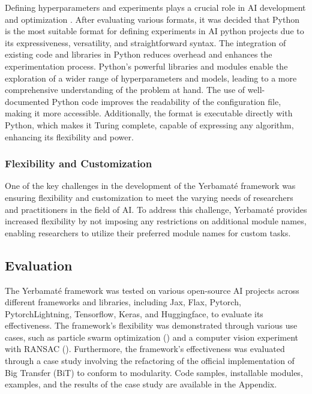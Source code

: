 Defining hyperparameters and experiments plays a crucial role in AI development and optimization \cite{wu2019hyperparameter}. After evaluating various formats, it was decided that Python is the most suitable format for defining experiments in AI python projects due to its expressiveness, versatility, and straightforward syntax. The integration of existing code and libraries in Python reduces overhead and enhances the experimentation process. Python's powerful libraries and modules enable the exploration of a wider range of hyperparameters and models, leading to a more comprehensive understanding of the problem at hand. The use of well-documented Python code improves the readability of the configuration file, making it more accessible. Additionally, the format is executable directly with Python, which makes it Turing complete, capable of expressing any algorithm, enhancing its flexibility and power.


\subsubsection{Flexibility and Customization}

One of the key challenges in the development of the Yerbamaté framework was ensuring flexibility and customization to meet the varying needs of researchers and practitioners in the field of AI. To address this challenge, Yerbamaté provides increased flexibility by not imposing any restrictions on additional module names, enabling researchers to utilize their preferred module names for custom tasks. 

\subsection{Evaluation}

The Yerbamaté framework was tested on various open-source AI projects across different frameworks and libraries, including Jax, Flax, Pytorch, Pytorch\-Lightning, Tensorflow, Keras, and Huggingface, to evaluate its effectiveness. The framework's flexibility was demonstrated through various use cases, such as particle swarm optimization (\cite{kennedy1995particle}) and a computer vision experiment with RANSAC (\cite{lowe2004distinctive}). Furthermore, the framework's effectiveness was evaluated through a case study involving the refactoring of the official implementation of Big Transfer (BiT) to conform to modularity. Code samples, installable modules, examples, and the results of the case study are available in the Appendix.
